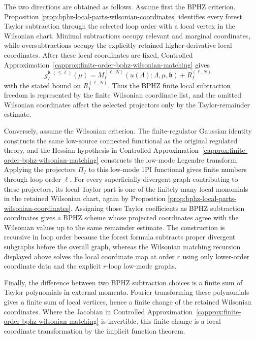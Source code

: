 The two directions are obtained as follows.  Assume first the BPHZ criterion.
Proposition
\ref{prop:bphz-local-parts-wilsonian-coordinates} identifies every forest
Taylor subtraction through the selected loop order with a local vertex in the
Wilsonian chart.  Minimal subtractions occupy relevant and marginal
coordinates, while oversubtractions occupy the explicitly retained
higher-derivative local coordinates.  After these local coordinates are fixed,
Controlled Approximation~\ref{capprox:finite-order-bphz-wilsonian-matching}
gives
\[
  g_I^{\mathfrak b,(\leq\ell)}(\mu)
  =
  M_I^{(\ell,N)}(u(\Lambda);\Lambda,\mu,\mathfrak b)
  +
  R_I^{(\ell,N)}
\]
with the stated bound on \(R_I^{(\ell,N)}\).  Thus the BPHZ finite local
subtraction freedom is represented by the finite Wilsonian coordinate list,
and the omitted Wilsonian coordinates affect the selected projectors only by
the Taylor-remainder estimate.

Conversely, assume the Wilsonian criterion.  The finite-regulator Gaussian
identity constructs the same low-source connected functional as the original
regulated theory, and the Hessian hypothesis in
Controlled Approximation~\ref{capprox:finite-order-bphz-wilsonian-matching}
constructs the low-mode Legendre transform.  Applying the projectors
\(\Pi_I\) to this low-mode 1PI
functional gives finite numbers through loop order \(\ell\).  For every
superficially divergent graph contributing to these projectors, its local
Taylor part is one of the finitely many local monomials in the retained
Wilsonian chart, again by Proposition
\ref{prop:bphz-local-parts-wilsonian-coordinates}.  Assigning those Taylor
coefficients as BPHZ subtraction coordinates gives a BPHZ scheme whose
projected coordinates agree with the Wilsonian values up to the same
remainder estimate.  The construction is recursive in loop order because the
forest formula subtracts proper divergent subgraphs before the overall graph,
whereas the Wilsonian matching recursion displayed above solves the local
coordinate map at order \(r\) using only lower-order coordinate data and the
explicit \(r\)-loop low-mode graphs.

Finally, the difference between two BPHZ subtraction choices is a finite sum
of Taylor polynomials in external momenta.  Fourier transforming these
polynomials gives a finite sum of local vertices, hence a finite change of
the retained Wilsonian coordinates.  Where the Jacobian in
Controlled Approximation~\ref{capprox:finite-order-bphz-wilsonian-matching}
is invertible, this finite change is a local coordinate transformation by the
implicit function theorem.

